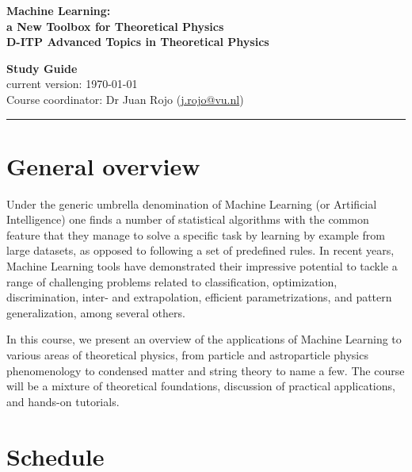 \documentclass[12pt]{article}
\numberwithin{equation}{section}
\begin{document}
\begin{spacing}{1.1}
\begin{figure}[h]
\begin{center}
\end{center}
\end{figure}


\begin{center}
  {\bf \Large  Machine Learning: \\[0.2cm]a New Toolbox for Theoretical Physics}\\[0.4cm]
   {\bf \large  D-ITP Advanced Topics in Theoretical Physics}\\[0.8cm]
  \end{center}

 
\begin{center}
  {\Large \bf Study Guide}\\
  current version: \today \\[0.3cm]

{\large  Course coordinator: Dr Juan Rojo (\href{mailto:j.rojo@vu.nl}{j.rojo@vu.nl}})
\end{center}



\vskip30pt
\hrule
\vskip20pt

\clearpage

\section{General overview}

Under the generic umbrella denomination of Machine Learning (or Artificial Intelligence) one finds a number of statistical algorithms with the common feature that they manage to solve a specific task by learning by example from large datasets, as opposed to following a set of predefined rules. In recent years, Machine Learning tools have demonstrated their impressive potential to tackle a range of challenging problems related to classification, optimization, discrimination, inter- and extrapolation, efficient parametrizations, and pattern generalization, among several others.

In this course, we present an overview of the applications of Machine Learning to various areas of theoretical physics, from particle and astroparticle physics phenomenology to condensed matter and string theory to name a few. The course will be a mixture of theoretical foundations, discussion of practical applications, and hands-on tutorials.

\section{Schedule}



\end{spacing}
\end{document}
